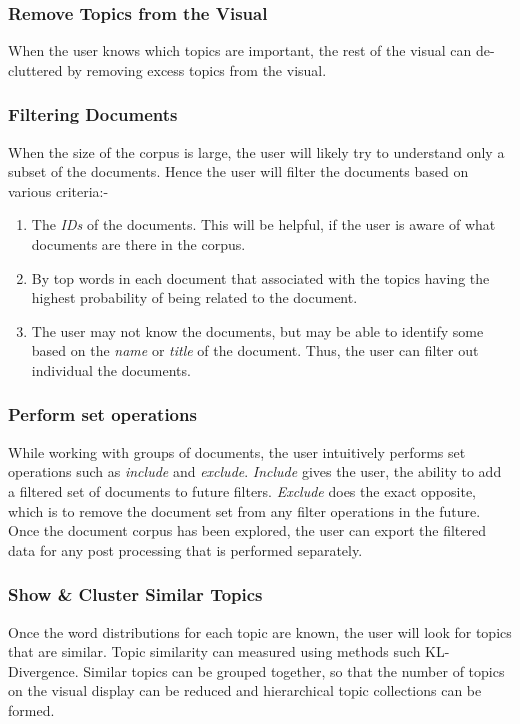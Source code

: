 \documentclass[10pt,journal,compsoc]{IEEEtran}
\begin{document}
\subsubsection{Remove Topics from the Visual}
When the user knows which topics are important, the rest of the visual can de-cluttered by removing excess topics from the visual.

\subsubsection{Filtering Documents}
When the size of the corpus is large, the user will likely try to understand only a subset of the documents. Hence the user will filter the documents based on various criteria:-
\begin{enumerate}
\item The \textit{IDs} of the documents. This will be helpful, if the user is aware of what documents are there in the corpus.
\item By top words in each document that associated with the topics having the highest probability of being related to the document.
\item The user may not know the documents, but may be able to identify some based on the \textit{name} or \textit{title} of the document. Thus, the user can filter out individual the documents.
\end{enumerate}

\subsubsection{Perform set operations}
While working with groups of documents, the user intuitively performs set operations such as \textit{include} and \textit{exclude}. \textit{Include} gives the user, the ability to add a filtered set of documents to future filters. \textit{Exclude} does the exact opposite, which is to remove the document set from any filter operations in the future. Once the document corpus has been explored, the user can export the filtered data for any post processing that is performed separately.

\subsubsection{Show \& Cluster Similar Topics}

Once the word distributions for each topic are known, the user will look for topics that are similar. Topic similarity can measured using methods such KL-Divergence. Similar topics can be grouped together, so that the number of topics on the visual display can be reduced and hierarchical topic collections can be formed.
\end{document}

